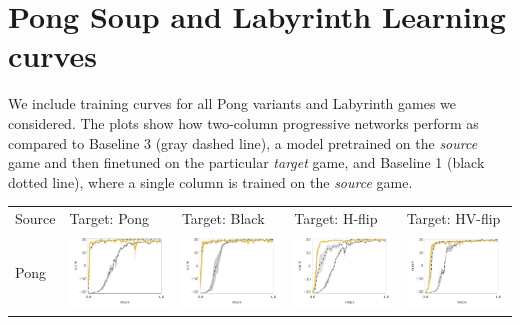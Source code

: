 \section{Pong Soup and Labyrinth Learning curves}
\label{sec:appendix_extra_curves}


We include training curves for all Pong variants and Labyrinth games we considered.
The plots show how two-column progressive networks perform as compared to Baseline 3 (gray dashed line), a model pretrained on the \textit{source} game and then finetuned on the particular \textit{target} game, and Baseline 1 (black dotted line), where a single column is trained on the \textit{source} game.

\begin{table}
     \begin{tabular}{m{} >{\centering}m{} >{\centering}m{} >{\centering}m{} >{\centering\arraybackslash}m{} }
	Source & Target: Pong & Target: Black & Target: H-flip & Target: HV-flip \\
     	
	Pong &
        \includegraphics[width=.22\textwidth]{figures/app_plots/pongs/pong/pong} &
        \includegraphics[width=.22\textwidth]{figures/app_plots/pongs/pong/pong_black} &
        \includegraphics[width=.22\textwidth]{figures/app_plots/pongs/pong/pong_h_flip} &
        \includegraphics[width=.22\textwidth]{figures/app_plots/pongs/pong/pong_hv_flip} \\


\end{tabular}
\end{table}
